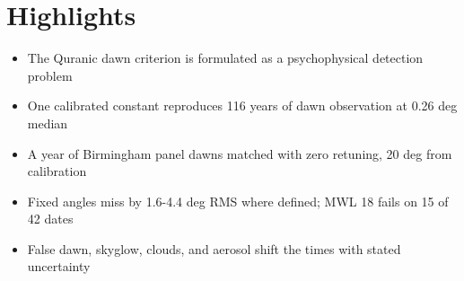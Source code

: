 \documentclass{article}
\begin{document}
\section*{Highlights}
\begin{itemize}
\item The Quranic dawn criterion is formulated as a psychophysical detection problem
\item One calibrated constant reproduces 116 years of dawn observation at 0.26 deg median
\item A year of Birmingham panel dawns matched with zero retuning, 20 deg from calibration
\item Fixed angles miss by 1.6-4.4 deg RMS where defined; MWL 18 fails on 15 of 42 dates
\item False dawn, skyglow, clouds, and aerosol shift the times with stated uncertainty
\end{itemize}
\end{document}
